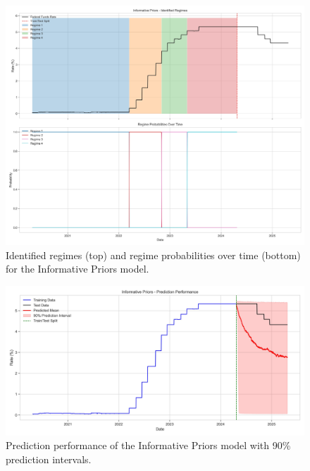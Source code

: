 \begin{figure}[htbp]
    \centering
    \includegraphics[width=\textwidth]{figure5_informative_priors_regimes.jpg}
    \caption{Identified regimes (top) and regime probabilities over time (bottom) for the Informative Priors model.}
    \label{fig:regimes}
\end{figure}

\begin{figure}[htbp]
    \centering
    \includegraphics[width=\textwidth]{figure6_informative_priors_prediction.jpg}
    \caption{Prediction performance of the Informative Priors model with 90\% prediction intervals.}
    \label{fig:prediction}
\end{figure}

